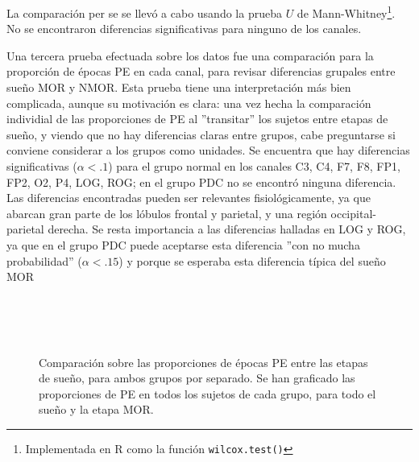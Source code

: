 La comparaci\'on per se se llev\'o a cabo usando la prueba %
$U$ de Mann-Whitney\footnote{Implementada en R como la funci\'on \texttt{wilcox.test()}}.
No se encontraron diferencias significativas para ninguno de los canales.


Una tercera prueba efectuada sobre los datos fue una comparaci\'on para la proporci\'on de \'epocas
PE en cada canal, para revisar diferencias grupales entre sue\~no MOR y NMOR.
Esta prueba tiene una interpretaci\'on m\'as bien complicada, aunque su motivaci\'on es clara:
una vez hecha la comparaci\'on individial de las proporciones de PE al 
''transitar'' los sujetos entre etapas de sue\~no, y viendo que 
no hay diferencias claras entre grupos, cabe preguntarse si conviene considerar a los grupos 
como unidades.
Se encuentra que hay diferencias significativas ($\alpha<.1$) para el grupo normal
en los canales C3, C4, F7, F8, FP1, FP2, O2, P4, LOG, ROG; en el grupo PDC no se encontr\'o
ninguna diferencia.
Las diferencias encontradas pueden ser relevantes fisiol\'ogicamente, ya que 
abarcan gran parte de los l\'obulos frontal y parietal, y una regi\'on occipital-parietal derecha.
Se resta importancia a las diferencias halladas en LOG y ROG, ya que en el grupo PDC puede
aceptarse esta diferencia ''con no mucha probabilidad'' ($\alpha<.15$) y porque se esperaba
esta diferencia t\'ipica del sue\~no MOR

\begin{figure}
\centering
{}\\
\\
\\
\caption{Comparaci\'on sobre las proporciones de \'epocas PE entre las etapas de sue\~no, 
para ambos grupos por separado. 
Se han graficado las proporciones de PE en todos los sujetos de cada grupo,
para todo el sue\~no y la etapa MOR.}
\label{comparacion_verde}
\end{figure}

